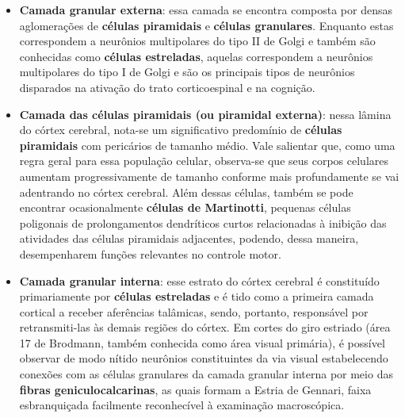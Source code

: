 \documentclass[
]{book}
\theoremstyle{definition}
\theoremstyle{definition}
\theoremstyle{definition}
\theoremstyle{definition}
\theoremstyle{remark}
\begin{document}
\begin{itemize}
\item
  \textbf{Camada granular externa}: essa camada se encontra composta por densas aglomerações de \textbf{células piramidais} e \textbf{células granulares}. Enquanto estas correspondem a neurônios multipolares do tipo II de Golgi e também são conhecidas como \textbf{células estreladas}, aquelas correspondem a neurônios multipolares do tipo I de Golgi e são os principais tipos de neurônios disparados na ativação do trato corticoespinal e na cognição.
\item
  \textbf{Camada das células piramidais (ou piramidal externa)}: nessa lâmina do córtex cerebral, nota-se um significativo predomínio de \textbf{células piramidais} com pericários de tamanho médio. Vale salientar que, como uma regra geral para essa população celular, observa-se que seus corpos celulares aumentam progressivamente de tamanho conforme mais profundamente se vai adentrando no córtex cerebral. Além dessas células, também se pode encontrar ocasionalmente \textbf{células de Martinotti}, pequenas células poligonais de prolongamentos dendríticos curtos relacionadas à inibição das atividades das células piramidais adjacentes, podendo, dessa maneira, desempenharem funções relevantes no controle motor.
\item
  \textbf{Camada granular interna}: esse estrato do córtex cerebral é constituído primariamente por \textbf{células estreladas} e é tido como a primeira camada cortical a receber aferências talâmicas, sendo, portanto, responsável por retransmiti-las às demais regiões do córtex. Em cortes do giro estriado (área 17 de Brodmann, também conhecida como área visual primária), é possível observar de modo nítido neurônios constituintes da via visual estabelecendo conexões com as células granulares da camada granular interna por meio das \textbf{fibras geniculocalcarinas}, as quais formam a Estria de Gennari, faixa esbranquiçada facilmente reconhecível à examinação macroscópica.
\end{itemize}
\end{document}
